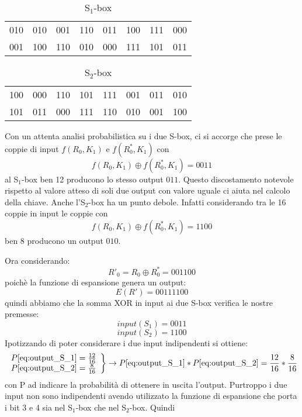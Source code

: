 \documentclass[11pt, a4paper, oneside]{Thesis} %
\begin{document}
\begin{table}[ht] 
\caption{S$_1$-box} %
\centering %
\begin{tabular}{c c c c c c c c} %
\hline %
010 & 010 & 001 & 110 & 011 & 100 & 111 & 000\\
001 & 100 & 110 & 010 & 000 & 111 & 101 & 011\\
\hline %
\end{tabular} 
\label{table:s1_example} %
\end{table}

\begin{table}[ht] 
\caption{S$_2$-box} %
\centering %
\begin{tabular}{c c c c c c c c} %
\hline %
100 & 000 & 110 & 101 & 111 & 001 & 011 & 010\\
101 & 011 & 000 & 111 & 110 & 010 & 001 & 100\\
\hline %
\end{tabular} 
\label{table:s2_example} %
\end{table}

Con un attenta analisi probabilistica su i due S-box, ci si accorge che prese le coppie di input $f(R_0,K_1)$ e $f(R^*_0,K_1)$ con
\[f(R_0,K_1) \oplus f(R^*_0,K_1)=0011\]
al S$_1$-box ben 12 producono lo stesso output $011$. Questo discostamento notevole rispetto al valore atteso di soli due output con valore uguale ci aiuta nel calcolo della chiave.
Anche l'S$_2$-box ha un punto debole. Infatti considerando tra le 16 coppie in input le coppie con 
\[f(R_0,K_1) \oplus f(R^*_0,K_1)=1100\]
ben 8 producono un output $010$.

Ora considerando:
\[R'_0 = R_0 \oplus R^*_0 = 001100\]
poichè la funzione di espansione genera un output:
\[ E(R') = 00111100\]
quindi abbiamo che la somma XOR in input ai due S-box verifica le nostre premesse:
\begin{equation}
  \label{eq:output_S_1} input(S_1)=0011 
\end{equation}
\begin{equation}
  \label{eq:output_S_2} input(S_2)=1100 
\end{equation}
Ipotizzando di poter considerare i due input indipendenti si ottiene:
\[\left .
    \begin{array}{l l}
      P\eqref{eq:output_S_1}={12 \over 16}\\
      P\eqref{eq:output_S_2} = {8 \over 16}
    \end{array}
  \right \} \to P\eqref{eq:output_S_1}*P\eqref{eq:output_S_2}={12 \over 16}*{8 \over 16}\]
con P ad indicare la probabilità di ottenere in uscita l'output. 
Purtroppo i due input non sono indipendenti avendo utilizzato la funzione di espansione che porta i bit 3 e 4 sia nel S$_1$-box che nel S$_2$-box. Quindi 
\end{document}
